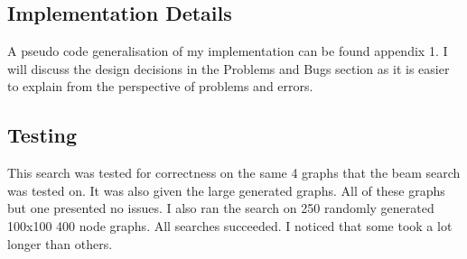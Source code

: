 \documentclass[]{article}
\begin{document}
\vspace*{0.8cm}
\subsection*{Implementation Details}
A pseudo code generalisation of my implementation can be found appendix 1.
I will discuss the design decisions in the Problems and Bugs section as it is easier to explain from the perspective of problems and errors.
\subsection*{Testing}
This search was tested for correctness on the same 4 graphs that the beam search was tested on. It was also given the large generated graphs. All of these graphs but one presented no issues. I also ran the search on 250 randomly generated 100x100 400 node graphs. All searches succeeded. I noticed that some took a lot longer than others.
\end{document}
